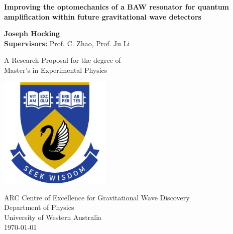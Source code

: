 \documentclass[aps,  
                a4paper, 
                amsmath, 
                amssymb, 
                preprint,
                tightenlines,  
                amsfonts,
                nofootinbib,
                onecolumn,
                titlepage,
                10pt
            ]{revtex4-2}
\begin{document}

\begin{titlepage}
    \begin{center}
            
        \Large
        \textbf{Improving the optomechanics of a BAW resonator for quantum amplification within future gravitational wave detectors}
            
            
        \vspace{1.5cm}
        
        \large
        \textbf{Joseph Hocking}\\
        \vspace{0.25cm}
        \textbf{Supervisors:} Prof. C. Zhao, Prof. Ju Li
            
        \vfill
            
        A Research Proposal for the degree of\\
        Master's in Experimental Physics
            
        \vspace{0.8cm}
            
        \includegraphics[width=0.4\textwidth]{img/uwa-logo.png}
            
        \large
        ARC Centre of Excellence for Gravitational Wave Discovery\\
        Department of Physics\\
        University of Western Australia\\
        \today
            
    \end{center}
\end{titlepage}
\end{document}
